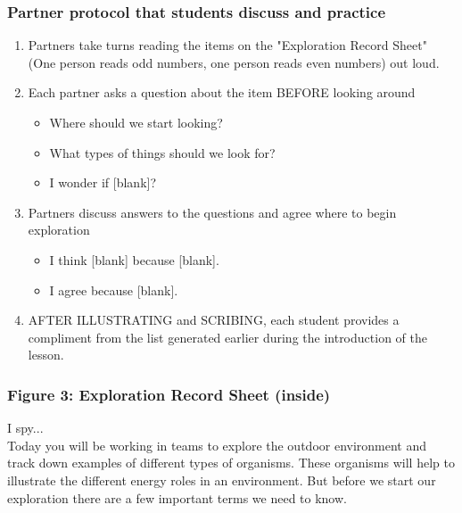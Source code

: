 \documentclass[11pt]{sig-alternate}
\begin{document}
\begin{large}
\subsubsection*{Partner protocol that students discuss and practice}
\begin{enumerate}
    \item Partners take turns reading the items on the "Exploration Record Sheet" (One person reads odd numbers, one person reads even numbers) out loud.
    \item Each partner asks a question about the item BEFORE looking around
    \begin{itemize}
        \item Where should we start looking?
        \item What types of things should we look for?
        \item I wonder if [blank]?
    \end{itemize}
    \item Partners discuss answers to the questions and agree where to begin exploration
    \begin{itemize}
        \item I think [blank] because [blank].
        \item I agree because [blank].
    \end{itemize}
    \item AFTER ILLUSTRATING and SCRIBING, each student provides a compliment from the list generated earlier during the introduction of the lesson.
\end{enumerate}

\subsubsection*{\textbf{Figure 3:} Exploration Record Sheet (inside)}
I spy...\\
Today you will be working in teams to explore the outdoor environment and track down examples of different types of organisms. These organisms will help to illustrate the different energy roles in an environment. But before we start our exploration there are a few important terms we need to know.


\end{large}
\end{document}
